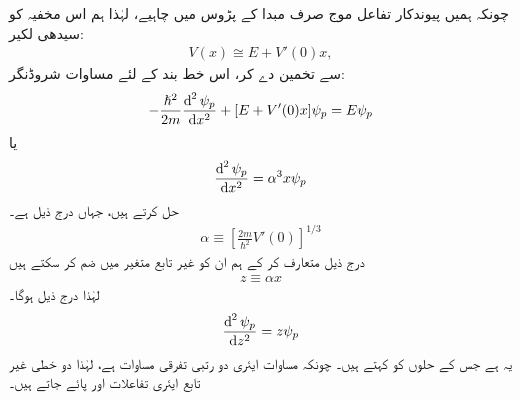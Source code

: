 چونکہ ہمیں پیوندکار تفاعل موج  صرف مبدا کے  پڑوس میں چاہیے،   لہٰذا ہم اس مخفیہ کو سیدھی لکیر: 
\begin{align}\label{مساوات_وقب_خط_بند_مخفیہ}
	V(x) \cong E + V'(0)x,
\end{align}
سے تخمین دے  کر،  اس خط بند   کے لئے مساوات شروڈنگر:
\begin{align*}
	-\frac{\hslash^{2}}{2m} \frac{\dif^{\,2}\psi_{p}}{\dif x^{2}} +[E+V'(0)x]\psi_{p}=E\psi_{p}
\end{align*}
یا 
\begin{align}
	\frac{\dif^{\,2} \psi_{p}}{\dif x^{2}} = \alpha^{3} x\psi_{p}
\end{align}
 حل کرتے ہیں، جہاں درج ذیل ہے۔
\begin{align}\label{مساوات_وقب_خط_بند_اور_مستقل}
	\alpha\equiv\left[\frac{2m}{\hslash^{2}} V'(0)\right]^{1/3}
\end{align}
درج ذیل متعارف کر کے ہم ان  کو غیر تابع متغیر میں ضم  کر سکتے ہیں
\begin{align}
	z\equiv\alpha x
\end{align}
لہٰذا درج ذیل ہوگا۔
\begin{align}
	\frac{\dif^{\,2}\psi_{p}}{\dif z^{2}}=z\psi_{p}
\end{align}
یہ   ہے جس کے حلوں کو  کہتے  ہیں۔  چونکہ مساوات ایئری دو رتبی تفرقی مساوات ہے،  لہٰذا دو خطی غیر تابع ایئری تفاعلات  اور  پائے جاتے ہیں۔

